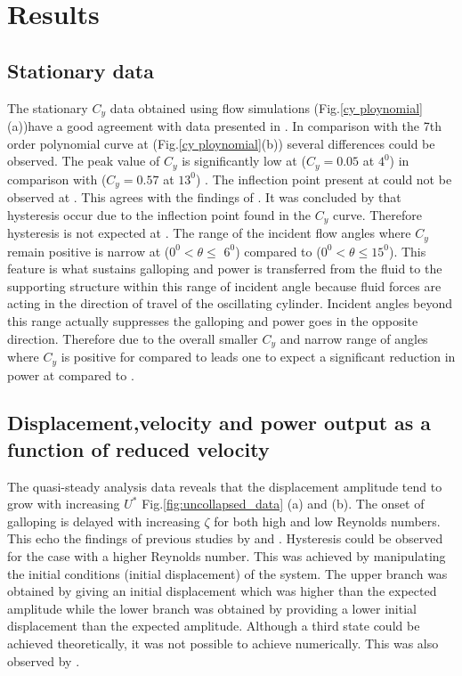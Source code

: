\section{Results}

\subsection{Stationary data}

The stationary $C_y$ data obtained using flow simulations (Fig.\ref{cy ploynomial}(a))have a good agreement with data presented in \cite{Joly2012}. In comparison with the 7th order polynomial curve at  (Fig.\ref{cy ploynomial}(b))  several differences could be observed. The peak value of $C_y$ is  significantly low at  ($C_y=0.05$ at $4^0$) in comparison with  ($C_y=0.57$ at $13^0$) . The inflection point present at  could not be observed at . This agrees with the findings of \cite{Luo2003}. It was concluded by \cite{Luo2003} that hysteresis occur due to the inflection point found in the $C_y$ curve. Therefore hysteresis is not expected at . The range of the incident flow angles where $C_y$ remain positive is narrow at  ($0^0 <\theta \leq$ $6^0$) compared to  ($0^0 <\theta \leq 15^0$). This feature is what sustains galloping and power is transferred from the fluid to the supporting structure within this range of incident angle because fluid forces are acting in the direction of travel of the oscillating cylinder. Incident angles beyond this range actually suppresses the galloping and power goes in the opposite direction. Therefore due to the overall smaller $C_y$ and narrow range of angles where $C_y$ is positive for  compared to  leads one to expect a significant reduction in power at compared to .

  



\subsection{Displacement,velocity and power output as a function of reduced velocity}


 The quasi-steady analysis data reveals that the displacement amplitude tend to grow with increasing $U^*$ Fig.\ref{fig:uncollapsed_data} (a) and (b). The onset of galloping is delayed with increasing $\zeta$ for both high and low Reynolds numbers. This echo the findings of previous studies by \cite{Parkinson1964} and \cite{Barrero-Gil2010a}. Hysteresis could be observed for the case with a higher Reynolds number. This was achieved by manipulating the initial conditions (initial displacement) of the system. The upper branch was obtained by giving an initial displacement which was higher than the expected amplitude while the lower branch was obtained by providing a lower initial displacement than the expected amplitude. Although a third state could be achieved theoretically, it was not possible to achieve numerically. This was also observed by \cite{Vio2007}.   

